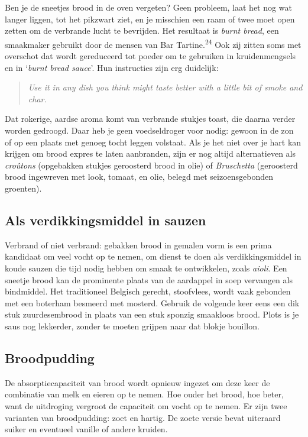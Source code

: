 \documentclass[
  11pt,
  dutch,
]{memoir}
\begin{document}
Ben je de sneetjes brood in de oven vergeten? Geen probleem, laat het
nog wat langer liggen, tot het pikzwart ziet, en je misschien een raam
of twee moet open zetten om de verbrande lucht te bevrijden. Het
resultaat is \emph{burnt bread}, een smaakmaker gebruikt door de mensen
van Bar Tartine.\textsuperscript{24} Ook zij zitten soms met overschot
dat wordt gereduceerd tot poeder om te gebruiken in kruidenmengsels en
in `\emph{burnt bread sauce}'. Hun instructies zijn erg duidelijk:

\begin{quote}
\emph{Use it in any dish you think might taste better with a little bit
of smoke and char.}
\end{quote}

Dat rokerige, aardse aroma komt van verbrande stukjes toast, die daarna
verder worden gedroogd. Daar heb je geen voedseldroger voor nodig:
gewoon in de zon of op een plaats met genoeg tocht leggen volstaat. Als
je het niet over je hart kan krijgen om brood expres te laten
aanbranden, zijn er nog altijd alternatieven als \emph{croûtons}
(opgebakken stukjes geroosterd brood in olie) of \emph{Bruschetta}
(geroosterd brood ingewreven met look, tomaat, en olie, belegd met
seizoensgebonden groenten).

\hypertarget{als-verdikkingsmiddel-in-sauzen}{%
\subsection{Als verdikkingsmiddel in
sauzen}\label{als-verdikkingsmiddel-in-sauzen}}

Verbrand of niet verbrand: gebakken brood in gemalen vorm is een prima
kandidaat om veel vocht op te nemen, om dienst te doen als
verdikkingsmiddel in koude sauzen die tijd nodig hebben om smaak te
ontwikkelen, zoals \emph{aioli}. Een sneetje brood kan de prominente
plaats van de aardappel in soep vervangen als bindmiddel. Het
traditioneel Belgisch gerecht, stoofvlees, wordt vaak gebonden met een
boterham besmeerd met mosterd. Gebruik de volgende keer eens een dik
stuk zuurdesembrood in plaats van een stuk sponzig smaakloos brood.
Plots is je saus nog lekkerder, zonder te moeten grijpen naar dat blokje
bouillon.

\hypertarget{broodpudding}{%
\subsection{Broodpudding}\label{broodpudding}}

De absorptiecapaciteit van brood wordt opnieuw ingezet om deze keer de
combinatie van melk en eieren op te nemen. Hoe ouder het brood, hoe
beter, want de uitdroging vergroot de capaciteit om vocht op te nemen.
Er zijn twee varianten van broodpudding: zoet en hartig. De zoete versie
bevat uiteraard suiker en eventueel vanille of andere kruiden.
\end{document}

